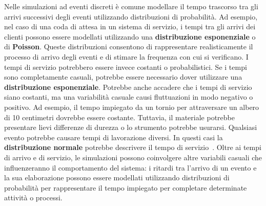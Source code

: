 \documentclass[12pt,a4paper,openright,twoside]{book}
\begin{document}
Nelle simulazioni ad eventi discreti è comune modellare il tempo trascorso tra gli arrivi successivi degli eventi utilizzando distribuzioni di probabilità. 
Ad esempio, nel caso di una coda di attesa in un sistema di servizio, i tempi tra gli arrivi dei clienti possono essere modellati utilizzando una \textbf{distribuzione esponenziale} o di \textbf{Poisson}. Queste distribuzioni consentono di rappresentare realisticamente il processo di arrivo degli eventi e di stimare la frequenza con cui si verificano.
I tempi di servizio potrebbero essere invece costanti o probabilistici. Se i tempi sono completamente casuali, potrebbe essere necessario dover utilizzare una \textbf{distribuzione esponenziale}. Potrebbe anche accadere che i tempi di servizio siano costanti, ma una variabilità casuale causi fluttuazioni in modo negativo o positivo. Ad esempio, il tempo impiegato da un tornio per attraversare un albero di 10 centimetri dovrebbe essere costante. Tuttavia, il materiale potrebbe presentare lievi differenze di durezza o lo strumento potrebbe usurarsi. Qualsiasi evento potrebbe causare tempi di lavorazione diversi. In questi casi la \textbf{distribuzione normale} potrebbe descrivere il tempo di servizio~\cite{DBLP:books/daglib/0034857}.
Oltre ai tempi di arrivo e di servizio, le simulazioni possono coinvolgere altre variabili casuali che influenzeranno il comportamento del sistema: i ritardi tra l'arrivo di un evento e la sua elaborazione possono essere modellati utilizzando distribuzioni di probabilità per rappresentare il tempo impiegato per completare determinate attività o processi.
\end{document}
